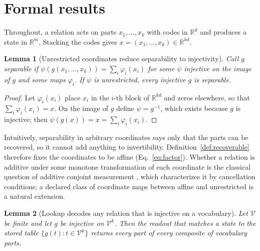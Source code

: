 \documentclass[10pt]{article}
\theoremstyle{plain}
\newtheorem{lemma}{Lemma}
\theoremstyle{remark}
\newcommand{\R}{\mathbb{R}}
\newcommand{\Voc}{\mathcal{V}}
\begin{document}



\clearpage
\appendix
{}

\section{Formal results}
\label{app:proofs}

Throughout, a relation acts on parts $x_1, \ldots, x_k$ with codes in $\R^d$ and produces a state in $\R^m$. Stacking the codes gives $x = (x_1, \ldots, x_k) \in \R^{kd}$.



\begin{lemma}[Unrestricted coordinates reduce separability to injectivity]
\label{lem:psi}
Call $g$ separable if $\psi(g(x_1, \ldots, x_k)) = \sum_i \varphi_i(x_i)$ for some $\psi$ injective on the image of $g$ and some maps $\varphi_i$. If $\psi$ is unrestricted, every injective $g$ is separable.
\end{lemma}

\begin{proof}
Let $\varphi_i(x_i)$ place $x_i$ in the $i$-th block of $\R^{kd}$ and zeros elsewhere, so that $\sum_i \varphi_i(x_i) = x$. On the image of $g$ define $\psi = g^{-1}$, which exists because $g$ is injective; then $\psi(g(x)) = x = \sum_i \varphi_i(x_i)$.
\end{proof}

\noindent
Intuitively, separability in arbitrary coordinates says only that the parts can be recovered, so it cannot add anything to invertibility. Definition~\ref{def:recoverable} therefore fixes the coordinates to be affine (Eq.~\ref{eq:factor}). Whether a relation is additive under some monotone transformation of each coordinate is the classical question of additive conjoint measurement \citep{luce1964}, which characterizes it by cancellation conditions; a declared class of coordinate maps between affine and unrestricted is a natural extension.

\begin{lemma}[Lookup decodes any relation that is injective on a vocabulary]
\label{lem:lookup}
Let $\Voc$ be finite and let $g$ be injective on $\Voc^k$. Then the readout that matches a state to the stored table $\{g(t) : t \in \Voc^k\}$ returns every part of every composite of vocabulary parts.
\end{lemma}
\end{document}
